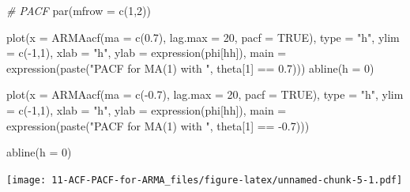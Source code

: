 \documentclass[
]{book}
\newenvironment{Shaded}{\begin{snugshade}}{\end{snugshade}}
\newcommand{\AttributeTok}[1]{\textcolor[rgb]{0.77,0.63,0.00}{#1}}
\newcommand{\CommentTok}[1]{\textcolor[rgb]{0.56,0.35,0.01}{\textit{#1}}}
\newcommand{\ConstantTok}[1]{\textcolor[rgb]{0.00,0.00,0.00}{#1}}
\newcommand{\DecValTok}[1]{\textcolor[rgb]{0.00,0.00,0.81}{#1}}
\newcommand{\FloatTok}[1]{\textcolor[rgb]{0.00,0.00,0.81}{#1}}
\newcommand{\FunctionTok}[1]{\textcolor[rgb]{0.00,0.00,0.00}{#1}}
\newcommand{\NormalTok}[1]{#1}
\newcommand{\SpecialCharTok}[1]{\textcolor[rgb]{0.00,0.00,0.00}{#1}}
\newcommand{\StringTok}[1]{\textcolor[rgb]{0.31,0.60,0.02}{#1}}
\theoremstyle{definition}
\theoremstyle{definition}
\theoremstyle{definition}
\theoremstyle{definition}
\theoremstyle{remark}
\begin{document}
\begin{Shaded}
\begin{Highlighting}[]
\CommentTok{\# PACF}
\FunctionTok{par}\NormalTok{(}\AttributeTok{mfrow =} \FunctionTok{c}\NormalTok{(}\DecValTok{1}\NormalTok{,}\DecValTok{2}\NormalTok{))}

\FunctionTok{plot}\NormalTok{(}\AttributeTok{x =} \FunctionTok{ARMAacf}\NormalTok{(}\AttributeTok{ma =} \FunctionTok{c}\NormalTok{(}\FloatTok{0.7}\NormalTok{), }\AttributeTok{lag.max =} \DecValTok{20}\NormalTok{, }\AttributeTok{pacf =} \ConstantTok{TRUE}\NormalTok{), }\AttributeTok{type =} \StringTok{"h"}\NormalTok{, }\AttributeTok{ylim =} \FunctionTok{c}\NormalTok{(}\SpecialCharTok{{-}}\DecValTok{1}\NormalTok{,}\DecValTok{1}\NormalTok{), }\AttributeTok{xlab =} \StringTok{"h"}\NormalTok{, }\AttributeTok{ylab =} \FunctionTok{expression}\NormalTok{(phi[hh]),}
       \AttributeTok{main =} \FunctionTok{expression}\NormalTok{(}\FunctionTok{paste}\NormalTok{(}\StringTok{"PACF for MA(1) with "}\NormalTok{, theta[}\DecValTok{1}\NormalTok{] }\SpecialCharTok{==} \FloatTok{0.7}\NormalTok{)))}
\FunctionTok{abline}\NormalTok{(}\AttributeTok{h =} \DecValTok{0}\NormalTok{)}


\FunctionTok{plot}\NormalTok{(}\AttributeTok{x =} \FunctionTok{ARMAacf}\NormalTok{(}\AttributeTok{ma =} \FunctionTok{c}\NormalTok{(}\SpecialCharTok{{-}}\FloatTok{0.7}\NormalTok{), }\AttributeTok{lag.max =} \DecValTok{20}\NormalTok{, }\AttributeTok{pacf =} \ConstantTok{TRUE}\NormalTok{), }\AttributeTok{type =} \StringTok{"h"}\NormalTok{, }\AttributeTok{ylim =} \FunctionTok{c}\NormalTok{(}\SpecialCharTok{{-}}\DecValTok{1}\NormalTok{,}\DecValTok{1}\NormalTok{), }\AttributeTok{xlab =} \StringTok{"h"}\NormalTok{, }\AttributeTok{ylab =} \FunctionTok{expression}\NormalTok{(phi[hh]),}
       \AttributeTok{main =} \FunctionTok{expression}\NormalTok{(}\FunctionTok{paste}\NormalTok{(}\StringTok{"PACF for MA(1) with "}\NormalTok{, theta[}\DecValTok{1}\NormalTok{] }\SpecialCharTok{==} \SpecialCharTok{{-}}\FloatTok{0.7}\NormalTok{)))}
  
\FunctionTok{abline}\NormalTok{(}\AttributeTok{h =} \DecValTok{0}\NormalTok{)}
\end{Highlighting}
\end{Shaded}

\texttt{[image: 11-ACF-PACF-for-ARMA\_files/figure-latex/unnamed-chunk-5-1.pdf]}
\end{document}

